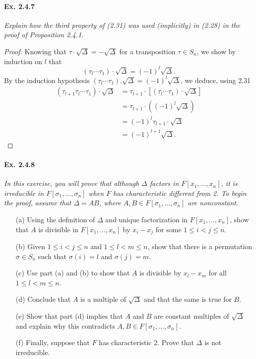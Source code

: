 \documentclass[11pt,a4paper]{article}
\begin{document}
\paragraph{Ex. 2.4.7}

{\it Explain how the third property of (2.31) was used (implicitly) in (2.28) in the proof of Proposition 2.4.1.
}

\begin{proof}
Knowing that $\tau \cdot \sqrt{\Delta} = -\sqrt{\Delta}$ for a transposition $\tau\in S_n$, we show by induction on  $l$ that
$$(\tau_l  \cdots \tau_1) \cdot \sqrt{\Delta} = (-1)^l\sqrt{\Delta}.$$
By the induction hypothesis $(\tau_l  \cdots \tau_1). \sqrt{\Delta}= (-1)^l\sqrt{\Delta}$, we deduce, using 2.31
\begin{align*}
(\tau _{l+1} \tau_l  \cdots \tau_1) \cdot \sqrt{\Delta}&= \tau _{l+1} \cdot [( \tau_l  \cdots \tau_1) \cdot \sqrt{\Delta}]\\
&= \tau _{l+1}\cdot ((-1)^l \sqrt{\Delta})\\
&=(-1)^l\tau_{l+1} \cdot \sqrt{\Delta}\\
&= (-1)^{l+1}\sqrt{\Delta}.
\end{align*}
\end{proof}

\paragraph{Ex. 2.4.8}

{\it In this exercise, you will prove that although $\Delta$ factors in $F[x_1,\ldots,x_n]$, it is irreducible in $F[\sigma_1,\ldots,\sigma_n]$ when $F$ has characteristic different from 2. To begin the proof, assume that $\Delta = AB$, where $A,B \in F[\sigma_1,\ldots,\sigma_n]$ are nonconstant.
\begin{enumerate}
\item[(a)] Using the definition of $\Delta$ and unique factorization in $F[x_1,\ldots,x_n]$, show that $A$ is divisible in $F[x_1,\ldots,x_n]$ by $x_i-x_j$ for some $1\leq i < j \leq n$.
\item[(b)] Given $1\leq i < j \leq n$ and $1\leq l < m \leq n$, show that there is a permutation $\sigma \in S_n$ such that $\sigma(i)= l$ and $\sigma(j)=m$.
\item[(c)]Use part (a) and (b) to show that $A$ is divisible by $x_l-x_m$ for all $1\leq l < m \leq n$.
\item[(d)] Conclude that $A$ is a multiple of $\sqrt{\Delta}$ and that the same is true for $B$.
\item[(e)] Show that part (d) implies that $A$ and $B$ are constant multiples of $\sqrt{\Delta}$ and explain why this contradicts $A,B \in F[\sigma_1,\ldots,\sigma_n]$.
\item[(f)] Finally, suppose that $F$ has characteristic 2. Prove that $\Delta$ is not irreducible.

\end{enumerate}
}
\end{document}
